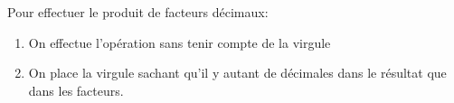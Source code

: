 Pour effectuer le produit de facteurs décimaux:
\begin{enumerate}
    \item On effectue l'opération sans tenir compte de la virgule
    \item On place la virgule sachant qu'il y autant de décimales dans le
    résultat que dans les facteurs.
\end{enumerate}